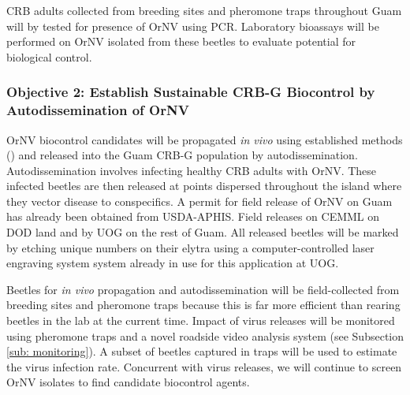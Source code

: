 \documentclass[12pt,letterpaper,english,bibliography=totocnumbered, abstract=on]{scrartcl}
\begin{document}
CRB adults collected from breeding sites and pheromone traps throughout Guam will by tested for presence of OrNV using PCR.  Laboratory bioassays will be performed on OrNV isolated from these beetles to evaluate potential for biological control. 

\subsubsection{Objective 2: Establish Sustainable CRB-G Biocontrol by Autodissemination of OrNV}

OrNV biocontrol candidates will be propagated \textit{in vivo} using established methods (\cite{huger_oryctes_2005-1}) and released into the Guam CRB-G population by autodissemination. Autodissemination involves infecting healthy CRB adults with OrNV. These infected beetles are then released at points dispersed throughout the island where they vector disease to conspecifics. A permit for field release of OrNV on Guam has already been obtained from USDA-APHIS. Field releases on CEMML on DOD land and by UOG on the rest of Guam. All released beetles will be marked by etching unique numbers on their elytra using a computer-controlled laser engraving system system already in use for this application at UOG.

Beetles for \textit{in vivo} propagation and autodissemination will be field-collected from breeding sites and pheromone traps because this is far more efficient than rearing beetles in the lab at the current time. Impact of virus releases will be monitored using pheromone traps and a novel roadside video analysis system (see Subsection \ref{sub: monitoring}). A subset of beetles captured in traps will be used to estimate the virus infection rate. Concurrent with virus releases, we will continue to screen OrNV isolates to find candidate biocontrol agents.
\end{document}
